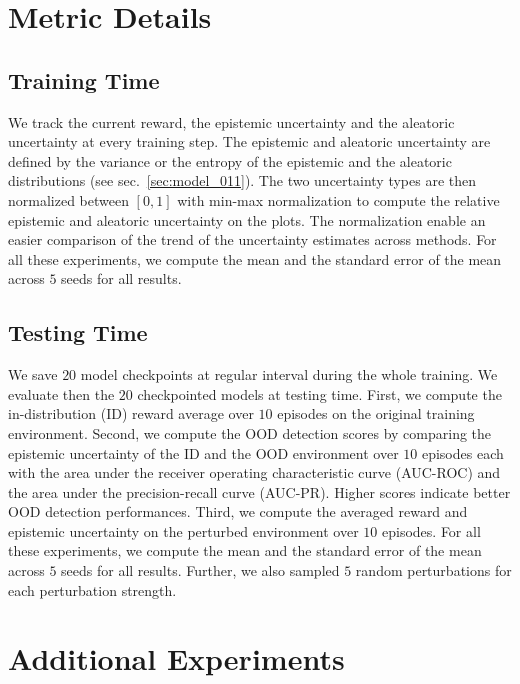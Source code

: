 \section{Metric Details}
\subsection{Training Time}
\label{app:training-time-metric-details}

We track the current reward, the epistemic uncertainty and the aleatoric uncertainty at every training step. The epistemic and aleatoric uncertainty are defined by the variance or the entropy of the epistemic and the aleatoric distributions (see sec.~\ref{sec:model_011}).  The two uncertainty types are then normalized between $[0, 1]$ with min-max normalization to compute the relative epistemic and aleatoric uncertainty on the plots. The normalization enable an easier comparison of the trend of the uncertainty estimates across methods. For all these experiments, we compute the mean and the standard error of the mean across $5$ seeds for all results.

\subsection{Testing Time}
\label{app:testing-time-metric-details}

We save $20$ model checkpoints at regular interval during the whole training. We evaluate then the $20$ checkpointed models at testing time. First, we compute the in-distribution (ID) reward average over $10$ episodes on the original training environment. Second, we compute the OOD detection scores by comparing the epistemic uncertainty of the ID and the OOD environment over $10$ episodes each with the area under the receiver operating characteristic curve (AUC-ROC) and the area under the precision-recall curve (AUC-PR). Higher scores indicate better OOD detection performances. Third, we compute the averaged reward and epistemic uncertainty on the perturbed environment over $10$ episodes. For all these experiments, we compute the mean and the standard error of the mean across $5$ seeds for all results. Further, we also sampled $5$ random perturbations for each perturbation strength.

\section{Additional Experiments}
\label{app:additional-experiments}

